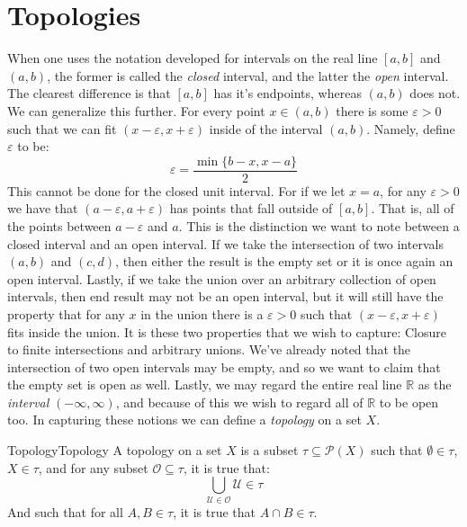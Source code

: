\section{Topologies}
    When one uses the notation developed for intervals on the real line $[a,b]$
    and $(a,b)$, the former is called the \textit{closed} interval, and the
    latter the \textit{open} interval. The clearest difference is that $[a,b]$
    has it's endpoints, whereas $(a,b)$ does not. We can generalize this
    further. For every point $x\in(a,b)$ there is some $\varepsilon>0$ such that
    we can fit $(x-\varepsilon,x+\varepsilon)$ inside of the interval $(a,b)$.
    Namely, define $\varepsilon$ to be:
    \begin{equation}
        \varepsilon=\frac{\min\{b-x,x-a\}}{2}
    \end{equation}
    This cannot be done for the closed unit interval. For if we let $x=a$, for
    any $\varepsilon>0$ we have that $(a-\varepsilon,a+\varepsilon)$ has points
    that fall outside of $[a,b]$. That is, all of the points between
    $a-\varepsilon$ and $a$. This is the distinction we want to note between a
    closed interval and an open interval. If we take the intersection of two
    intervals $(a,b)$ and $(c,d)$, then either the result is the empty set or it
    is once again an open interval. Lastly, if we take the union over an
    arbitrary collection of open intervals, then end result may not be an open
    interval, but it will still have the property that for any $x$ in the union
    there is a $\varepsilon>0$ such that $(x-\varepsilon,x+\varepsilon)$ fits
    inside the union. It is these two properties that we wish to capture:
    Closure to finite intersections and arbitrary unions. We've already noted
    that the intersection of two open intervals may be empty, and so we want to
    claim that the empty set is open as well. Lastly, we may regard the entire
    real line $\mathbb{R}$ as the \textit{interval} $(\minus\infty,\infty)$, and
    because of this we wish to regard all of $\mathbb{R}$ to be open too. In
    capturing these notions we can define a \textit{topology} on a set $X$.
    \begin{fdefinition}{Topology}{Topology}
        A topology on a set $X$ is a subset
        $\tau\subseteq\mathcal{P}(X)$ such that $\emptyset\in\tau$, $X\in\tau$,
        and for any subset $\mathcal{O}\subseteq\tau$, it is true that:
        \begin{equation}
            \bigcup_{\mathcal{U}\in\mathcal{O}}\mathcal{U}\in\tau
        \end{equation}
        And such that for all $A,B\in\tau$, it is true that $A\cap{B}\in\tau$.
    \end{fdefinition}
